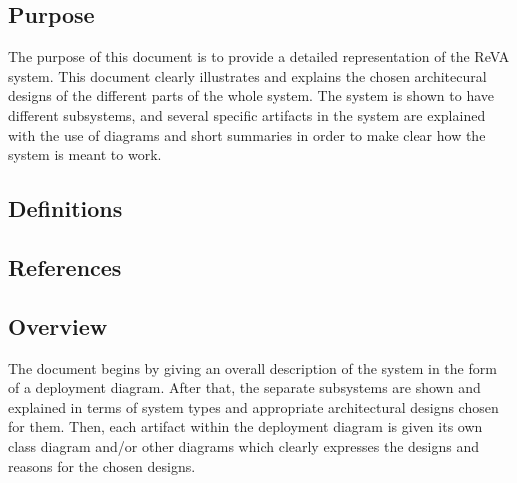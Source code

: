 \subsection{Purpose}
The purpose of this document is to provide a detailed representation of the ReVA system. This document clearly illustrates and explains the chosen architecural designs of the different parts of the whole system. The system is shown to have different subsystems, and several specific artifacts in the system are explained with the use of diagrams and short summaries in order to make clear how the system is meant to work.
\subsection{Definitions}
\subsection{References}
\subsection{Overview}
The document begins by giving an overall description of the system in the form of a deployment diagram. After that, the separate subsystems are shown and explained in terms of system types and appropriate architectural designs chosen for them. Then, each artifact within the deployment diagram is given its own class diagram and/or other diagrams which clearly expresses the designs and reasons for the chosen designs.